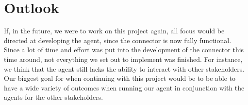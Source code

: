 \chapter{Outlook}
\label{chap:Outlook}

If, in the future, we were to work on this project again, all focus would be directed at developing the agent, since the connector is now fully functional.
Since a lot of time and effort was put into the development of the connector this time around, not everything we set out to implement was finished. For instance, we think that the agent still lacks the ability to interact with other stakeholders.
Our biggest goal for when continuing with this project would be to be able to have a wide variety of outcomes when running our agent in conjunction with the agents for the other stakeholders.